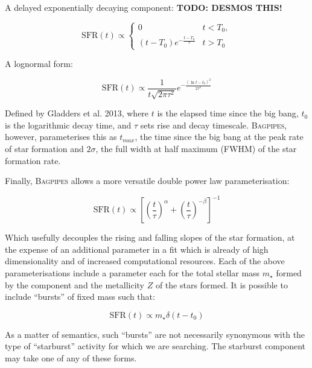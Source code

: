 \documentclass[a4paper,11pt]{article}
\begin{document}
\noindent A delayed exponentially decaying component: \textbf{TODO: DESMOS THIS!}

\begin{equation}
  \mathrm{SFR}(t) \propto
  \begin{cases}
    0 & t < T_0, \\
    (t-T_0)e^{-\frac{t-T_0}{\tau}} & t > T_0
  \end{cases}
\end{equation}

\noindent A lognormal form:

\begin{equation}
  \mathrm{SFR}(t) \propto
  \frac{1}{t\sqrt{2\pi\tau^2}}
  e^{-\frac{\left(\ln{t-t_0}\right)^2}{2\tau^2}}
\end{equation}

\noindent Defined by Gladders et al. 2013, where $t$ is the elapsed time since the big bang, $t_0$ is the logarithmic decay time, and $\tau$ sets rise and decay timescale.\cite{Gladders_2013} \textsc{Bagpipes}, however, parameterises this as $t_{max}$, the time since the big bang at the peak rate of star formation and $2\sigma$, the full width at half maximum (FWHM) of the star formation rate.\cite{Carnall_2018}

Finally, \textsc{Bagpipes} allows a more versatile double power law parameterisation:

\begin{equation}
  \mathrm{SFR}(t)\propto
  \left[
  \left(\frac{t}{\tau}\right)^{\alpha} +
  \left(\frac{t}{\tau}\right)^{-\beta}
  \right]
  ^{-1}
\end{equation}

\noindent Which usefully decouples the rising and falling slopes of the star formation, at the expense of an additional parameter in a fit which is already of high dimensionality and of increased computational resources.\cite{Carnall_2018} Each of the above parameterisations include a parameter each for the total stellar mass $m_\star$ formed by the component and the metallicity $Z$ of the stars formed. It is possible to include ``bursts'' of fixed mass such that:

\begin{equation}
  \mathrm{SFR}(t)\propto
  m_\star \delta(t-t_0)
\end{equation}

\noindent As a matter of semantics, such ``bursts'' are not necessarily synonymous with the type of ``starburst'' activity for which we are searching. The starburst component may take one of any of these forms.
\end{document}
